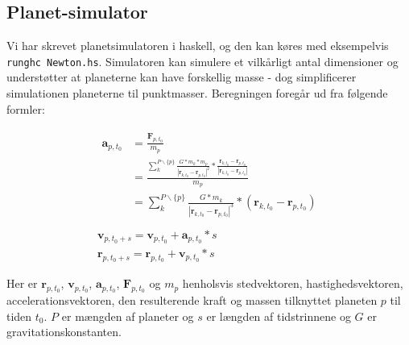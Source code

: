 \subsection{Planet-simulator}
Vi har skrevet planetsimulatoren i haskell, og den kan køres med eksempelvis
{\tt runghc Newton.hs}. Simulatoren kan simulere et vilkårligt antal dimensioner
og understøtter at planeterne kan have forskellig masse - dog simplificerer
simulationen planeterne til punktmasser. Beregningen foregår ud fra følgende
formler:

\begin{gather*}
\begin{split}
\mathbf{a}_{p,t_0} &= \frac{\mathbf{F}_{p,t_0}}{m_p}\\
&= \frac{\sum_k^{P \backslash \{p\}} \frac{G*m_k*m_p}{|\mathbf{r}_{k,t_0} - \mathbf{r}_{p,t_0}|^2} *
\frac{\mathbf{r}_{k,t_0} - \mathbf{r}_{p,t_0}}{|\mathbf{r}_{k,t_0} - \mathbf{r}_{p,t_0}|}}{m_p} \\
&= \sum_k^{P \backslash \{p\}} \frac{G*m_k}{|\mathbf{r}_{k,t_0} - \mathbf{r}_{p,t_0}|^3}
* (\mathbf{r}_{k,t_0} - \mathbf{r}_{p,t_0})
\end{split} \\
\\
\mathbf{v}_{p,t_0+s} = \mathbf{v}_{p,t_0} + \mathbf{a}_{p,t_0}*s \\
\mathbf{r}_{p,t_0+s} = \mathbf{r}_{p,t_0} + \mathbf{v}_{p,t_0}*s
\end{gather*}

Her er $\mathbf{r}_{p,t_0}$, $\mathbf{v}_{p,t_0}$, $\mathbf{a}_{p,t_0}$,
$\mathbf{F}_{p,t_0}$ og $m_p$ henholsvis stedvektoren, hastighedsvektoren,
accelerationsvektoren, den resulterende kraft og massen tilknyttet planeten $p$
til tiden $t_0$. $P$ er mængden af planeter og $s$ er længden af tidstrinnene
og $G$ er gravitationskonstanten.


